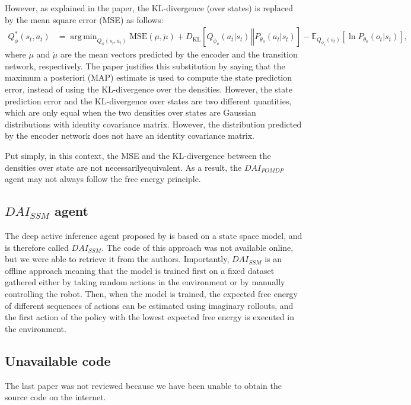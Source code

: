 \documentclass[twoside,11pt]{article}
\newcommand{\kl}[2]{D_{\mathrm{KL}} \left[ \left. \left. #1 \right|\right| #2 \right] }
\DeclareMathOperator*{\argmin}{arg\,min}
\begin{document}
However, as explained in the paper, the KL-divergence (over states) is replaced by the mean square error (MSE) as follows:
\begin{align*}
Q^*_{\phi}(s_t, a_t) &= \argmin_{Q_{\phi}(s_t, a_t)} \text{MSE}(\mu, \mathring{\mu}) + \kl{Q_{\phi_a}(a_t|s_t)}{P_{\theta_a}(a_t|s_t)} - \mathbb{E}_{Q_{\phi_s}(s_t)}[\ln P_{\theta_o}(o_t|s_t)],
\end{align*}
where $\mu$ and $\mathring{\mu}$ are the mean vectors predicted by the encoder and the transition network, respectively. The paper justifies this substitution by saying that the maximum a posteriori (MAP) estimate is used to compute the state prediction error, instead of using the KL-divergence over the densities. However, the state prediction error and the KL-divergence over states are two different quantities, which are only equal when the two densities over states are Gaussian distributions with identity covariance matrix. However, the distribution predicted by the encoder network does not have an identity covariance matrix.

Put simply, in this context, the MSE and the KL-divergence between the densities over state are not necessarilyequivalent. As a result, the $DAI_{POMDP}$ agent may not always follow the free energy principle.

\subsection{$DAI_{SSM}$ agent \citep{DAI_POMDP}}

The deep active inference agent proposed by \citep{ccatal2020learning} is based on a state space model, and is therefore called $DAI_{SSM}$. The code of this approach was not available online, but we were able to retrieve it from the authors. Importantly, $DAI_{SSM}$ is an offline approach meaning that the model is trained first on a fixed dataset gathered either by taking random actions in the environment or by manually controlling the robot. Then, when the model is trained, the expected free energy of different sequences of actions can be estimated using imaginary rollouts, and the first action of the policy with the lowest expected free energy is executed in the environment.

\subsection{Unavailable code}

The last paper \citep{schneider2022active} was not reviewed because we have been unable to obtain the source code on the internet. 
\end{document}
